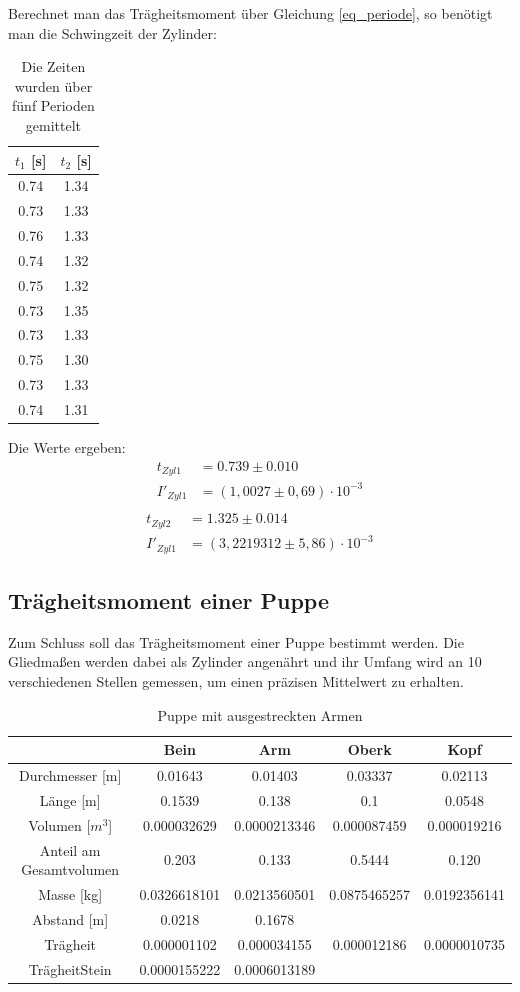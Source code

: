 Berechnet man das Trägheitsmoment über Gleichung \eqref{eq_periode}, so benötigt man die Schwingzeit der Zylinder:
\begin{table}[htbp]
\begin{tabular}{|c|c|}
\hline 
$t_1$ [s] & $t_2$ [s]\\ \hline
0.74&	1.34\\ \hline
0.73&	1.33\\ \hline
0.76&	1.33\\ \hline
0.74&	1.32\\ \hline
0.75&	1.32\\ \hline
0.73&	1.35\\ \hline
0.73&	1.33\\ \hline
0.75&	1.30\\ \hline
0.73&	1.33\\ \hline
0.74&	1.31\\ \hline
\end{tabular} 
\caption{Die Zeiten wurden über fünf Perioden gemittelt}
\end{table}
\newpage
Die Werte ergeben:
\begin{align*}
t_{Zyl 1}&=0.739 \pm 0.010\\
I'_{Zyl 1}&=(1,0027\pm0,69)\cdot10^{-3}\\
\end{align*}
\begin{align*}
t_{Zyl 2}&=1.325 \pm  0.014\\
I'_{Zyl 1}&=(3,2219312\pm5,86)\cdot10^{-3}
\end{align*}

\subsection{Trägheitsmoment einer Puppe}
Zum Schluss soll das Trägheitsmoment einer Puppe bestimmt werden. Die Gliedmaßen werden dabei als Zylinder angenährt und ihr Umfang wird an 10 verschiedenen Stellen gemessen, um einen präzisen Mittelwert zu erhalten.
\begin{table}[htbp]
\begin{tabular}{|c|c|c|c|c|}
\hline 		
&	Bein&	Arm	&Oberk	&Kopf	\\ \hline	
Durchmesser [m]&	0.01643&	0.01403&	0.03337&	0.02113\\ \hline				
Länge [m] &	0.1539	&0.138	&0.1	&0.0548\\ \hline	
					
Volumen [$m^3$]	&0.000032629	&0.0000213346	&0.000087459	&0.000019216	\\ \hline	
Anteil am Gesamtvolumen	&0.203	&0.133	&0.5444	&0.120	\\ \hline		
Masse [kg]	&0.0326618101	&0.0213560501	&0.0875465257	&0.0192356141\\ \hline
Abstand [m]	&0.0218	&0.1678	&&\\ \hline	
					
Trägheit&	0.000001102	&0.000034155&	0.000012186	&0.0000010735\\ \hline	
TrägheitStein	&0.0000155222	&0.0006013189	&&	\\ \hline	
\end{tabular} 
\caption{Puppe mit ausgestreckten Armen}
\end{table}

